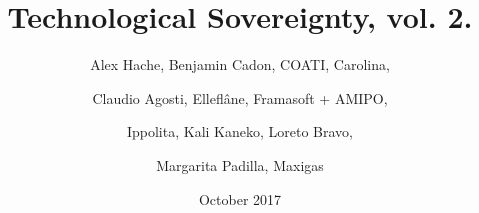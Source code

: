 \title{Technological Sovereignty, vol. 2.}
\author{
	Alex Hache, Benjamin Cadon, COATI, Carolina, \and 
	Claudio Agosti, Elleflâne, Framasoft + AMIPO, \and
	Ippolita, Kali Kaneko, Loreto Bravo,\and
	Margarita Padilla, Maxigas } 
\date{October 2017}
